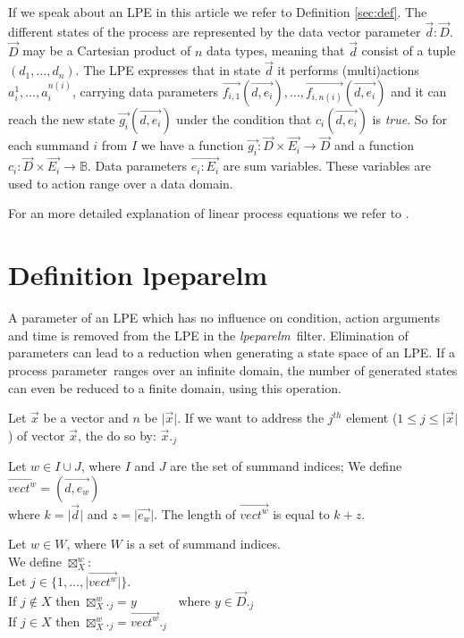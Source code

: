 \documentclass[a4paper,10pt]{article}
\theoremstyle{plain}
\theoremstyle{definition}
\newcommand{\lpe}{linear process equation}
\newcommand{\tool}{\textit{lpeparelm}}
\newcommand{\ti}{\textit}
\newcommand{\ovr}{\overrightarrow}
\newcommand{\pp}{process parameter}
\begin{document}
If we speak about an LPE in this article we refer to Definition \ref{sec:def}.  The different states 
of the process are represented by the data vector parameter $\ovr{d}:\ovr{D}$. $\ovr{D}$ may be a Cartesian product of $n$ data types, meaning that $\ovr{d}$ consist of a tuple $(d_1, \ldots, d_n)$. The LPE expresses that in state $\ovr{d}$ it performs (multi)actions $a_i^1, \ldots , a_i^{n(i)}$, carrying data parameters $\ovr{f_{i,1}}(\ovr{d,e_i}), \ldots , \ovr{f_{i,n(i)}}(\ovr{d, e_i})$ and 
it can reach the new state $\ovr{g_i}(\ovr{d ,e_i})$ under the condition that $c_i(\ovr{d , e_i})$ is \ti{true}. So for each summand $i$ from $I$ we have a function $\ovr{g_i}: \ovr{D} \times \ovr{E_i} \rightarrow \ovr{D}$ and a function $c_i: \ovr{D} \times \ovr{E_i} \rightarrow \mathbb{B}$.
Data parameters $\ovr{e_i : E_i}$ are sum variables. These variables are used to action range over a data domain. 

For an more detailed explanation of \lpe s  we refer to \cite{LPE_info}.

\section{Definition lpeparelm}
A parameter of an LPE which has no influence on condition, action arguments and time is removed from the LPE in the \tool\ filter. Elimination of parameters can lead to a reduction when generating a state space of an LPE. If a \pp\ ranges over an infinite domain, the number of generated states can even be reduced to a finite domain, using this operation. %

\begin{defn}
Let $\ovr{x}$ be a vector and  $n$ be $\vert \ovr{x} \vert$. If we want to address the $j^{th}$ element ($ 1 \leq j \leq \vert \ovr{x} \vert $) of vector $\ovr{x}$, the do so by:
$\ovr{x}._j$
\end{defn}

\begin{defn}
Let $w \in I \cup J$, where $I$ and $J$ are the set of summand indices; We define \\
 $\ovr{vect^w} = (\ovr{d , e_w})$\\
where $k = \vert \ovr{d} \vert$ and $z = \vert \ovr{e_w} \vert$. The length of $ \ovr{vect^w}$ is equal to $k + z$.
\end{defn}

\begin{defn}[$\boxtimes^w_X$]
Let $w \in W$, where $W$ is a set of summand indices.\\
We define $\boxtimes^w_X$:\\
Let $j \in \lbrace 1, \dots, \vert \ovr{vect^w} \vert \rbrace.$\\
If $j \not\in X$ then $\boxtimes^w_X._j = y \hspace{40pt} \text{where }y \in \ovr{D}._j$ \\
If $j \in X$ then $\boxtimes^w_X._j = \ovr{vect^w}._j$ \\
\end{defn}
\end{document}
